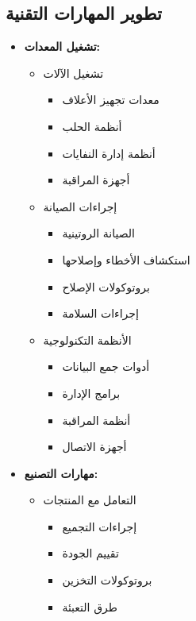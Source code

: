 \subsection{تطوير المهارات التقنية}
\begin{itemize}
    \item \textbf{تشغيل المعدات:}
    \begin{itemize}
        \item تشغيل الآلات
        \begin{itemize}
            \item معدات تجهيز الأعلاف
            \item أنظمة الحلب
            \item أنظمة إدارة النفايات
            \item أجهزة المراقبة
        \end{itemize}
        
        \item إجراءات الصيانة
        \begin{itemize}
            \item الصيانة الروتينية
            \item استكشاف الأخطاء وإصلاحها
            \item بروتوكولات الإصلاح
            \item إجراءات السلامة
        \end{itemize}
        
        \item الأنظمة التكنولوجية
        \begin{itemize}
            \item أدوات جمع البيانات
            \item برامج الإدارة
            \item أنظمة المراقبة
            \item أجهزة الاتصال
        \end{itemize}
    \end{itemize}
    
    \item \textbf{مهارات التصنيع:}
    \begin{itemize}
        \item التعامل مع المنتجات
        \begin{itemize}
            \item إجراءات التجميع
            \item تقييم الجودة
            \item بروتوكولات التخزين
            \item طرق التعبئة
        \end{itemize}
        

\end{itemize}
\end{itemize}
